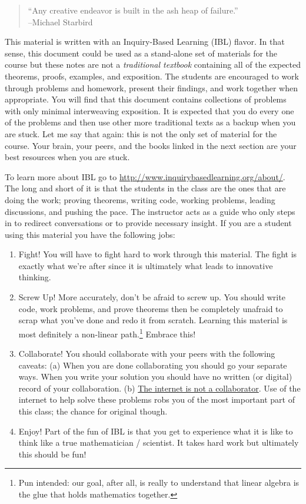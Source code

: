 \begin{quote}
    ``Any creative endeavor is built in the ash heap of failure.'' \\ --Michael Starbird
\end{quote}

This material is written with an Inquiry-Based Learning (IBL) flavor. In that sense, this
document could be used as a stand-alone set of materials for the course but these notes
are not a {\it traditional textbook} containing all of the expected theorems, proofs,
examples, and exposition. The students are encouraged to work through problems and
homework, present their findings, and work together when appropriate. You will find that
this document contains collections of problems with only minimal interweaving exposition.
It is expected that you do every one of the problems and then use other more traditional
texts as a backup when you are stuck.  Let me say that again: this is not the only set of
material for the course.  Your brain, your peers, and the books linked in the next section
are your best resources when you are stuck.

To learn more about IBL go to
\href{http://www.inquirybasedlearning.org/about/}{http://www.inquirybasedlearning.org/about/}.
The long and short of it is that the students in the class are the ones that are doing the
work; proving theorems, writing code, working problems, leading discussions, and pushing the pace. The
instructor acts as a guide who only steps in to redirect conversations or to provide
necessary insight. If you are a student using this material you have the following jobs:
\begin{enumerate}
\item Fight!  You will have to fight hard to work through this material.  The fight is
        exactly what we're after since it is ultimately what leads to innovative thinking.
\item Screw Up!  More accurately, don't be afraid to screw up.  You should write code,
    work problems, and prove theorems then be completely unafraid to scrap what you've
    done and redo it from scratch.  Learning this material is most definitely a non-linear
    path.\footnote{Pun intended: our goal, after all, is really to understand that linear
        algebra is the glue that holds mathematics together.}
        Embrace this!
\item Collaborate!  You should collaborate with your peers with the following caveats:
        (a) When you are done collaborating you should go your separate ways.  When you
        write your solution you should have no written (or digital) record of your
        collaboration.  (b) \underline{The internet is not a collaborator}.  Use of the internet to
        help solve these problems robs you of the most important part of this class; the
        chance for original though.
\item Enjoy!  Part of the fun of IBL is that you get to experience what it is like to
        think like a true mathematician / scientist.  It takes hard work but ultimately
        this should be fun!
\end{enumerate}

